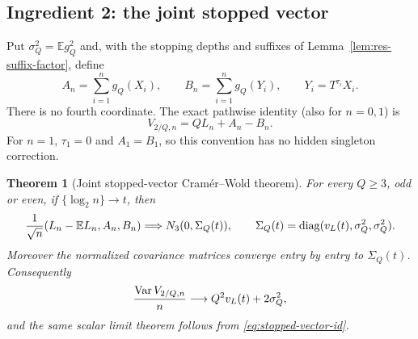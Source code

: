 \documentclass[11pt]{article}
\numberwithin{equation}{section}
\newtheorem{theorem}{Theorem}[section]
\newcommand{\1}{\mathbf 1}\newcommand{\F}{\mathcal F}\newcommand{\D}{\mathcal D}
\begin{document}
\subsection{Ingredient 2: the joint stopped vector}
Put $\sigma_Q^2=\mathbb E g_Q^2$ and, with the stopping depths and suffixes
of Lemma~\ref{lem:res-suffix-factor}, define
\[
 A_n=\sum_{i=1}^ng_Q(X_i),\qquad B_n=\sum_{i=1}^ng_Q(Y_i),
 \qquad Y_i=T^{\tau_i}X_i.
\]
There is no fourth coordinate.  The exact pathwise identity (also for
$n=0,1$) is
\begin{equation}
 V_{2/Q,n}=QL_n+A_n-B_n.                         \label{eq:stopped-vector-id}
\end{equation}
For $n=1$, $\tau_1=0$ and $A_1=B_1$, so this convention has no hidden
singleton correction.

\begin{theorem}[Joint stopped-vector Cram\'er--Wold theorem]
\label{thm:joint-stopped-vector}
For every $Q\ge3$, odd or even, if $\{\log _2n\}\to t$, then
\[
 {1\over\sqrt n}(L_n-\mathbb EL_n,A_n,B_n)
 \Longrightarrow N_3(0,\Sigma_Q(t)),\qquad
 \Sigma_Q(t)=\operatorname {diag}(v_L(t),\sigma_Q^2,\sigma_Q^2).
\]
Moreover the normalized covariance matrices converge entry by entry to
$\Sigma_Q(t)$.  Consequently
\[
 {\operatorname {Var}V_{2/Q,n}\over n}\longrightarrow
 Q^2v_L(t)+2\sigma_Q^2,
\]
and the same scalar limit theorem follows from \eqref{eq:stopped-vector-id}.
\end{theorem}
\end{document}
